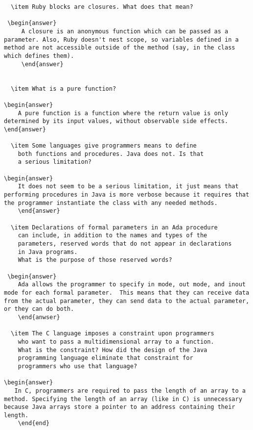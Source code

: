 \begin{enumerate}
\begin{answer}
\begin{lstlisting}
  \item Ruby blocks are closures. What does that mean?

 \begin{answer}
     A closure is an anonymous function which can be passed as a parameter. Also, Ruby doesn't nest scope, so variables defined in a method are not accessible outside of the method (say, in the class which defines them).
     \end{answer}
   

  \item What is a pure function?

\begin{answer}
    A pure function is a function where the return value is only determined by its input values, without observable side effects.
\end{answer}

  \item Some languages give programmers means to define
    both functions and procedures. Java does not. Is that
    a serious limitation?

\begin{answer}
    It does not seem to be a serious limitation, it just means that performing procedures in Java is more verbose because it requires that the programmer instantiate the class with any needed methods.
    \end{answer}

  \item Declarations of formal parameters in an Ada procedure
    can include, in addition to the names and types of the
    parameters, reserved words that do not appear in declarations
    in Java programs. 
    What is the purpose of those reserved words?
 
 \begin{answer}
    Ada allows the programmer to specify in mode, out mode, and inout mode for each formal parameter.  This means that they can receive data from the actual parameter, they can send data to the actual parameter, or they can do both.
    \end{anwser}

  \item The C language imposes a constraint upon programmers
    who want to pass a multidimensional array to a function.
    What is the constraint? How did the design of the Java
    programming language eliminate that constraint for 
    programmers who use that language?

\begin{answer}
   In C, programmers are required to pass the length of an array to a method. Specifying the length of an array (like in C) is unnecessary because Java arrays store a pointer to an address containing their length.
    \end{end}


\end{lstlisting}
\end{answer}
\end{enumerate}
